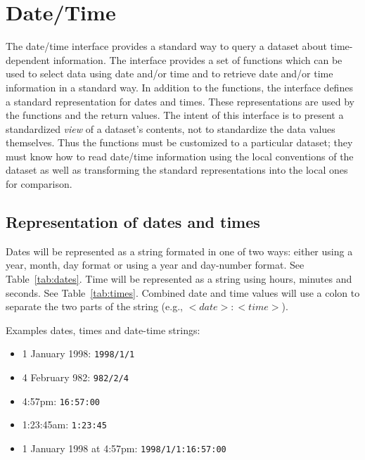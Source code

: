 \documentclass[12pt]{article}
\begin{document}
\begin{description}
\begin{description}
\begin{description}
    \end{description}

  \end{description}

\end{description}

\section{Date/Time}
\label{app:datetime}

The date/time interface provides a standard way to query a dataset about
time-dependent information. The interface provides a set of functions which
can be used to select data using date and/or time and to retrieve date and/or
time information in a standard way. In addition to the functions, the
interface defines a standard representation for dates and times. These
representations are used by the functions and the return values. The intent
of this interface is to present a standardized \emph{view} of a dataset's
contents, not to standardize the data values themselves. Thus the functions
must be customized to a particular dataset; they must know how to read
date/time information using the local conventions of the dataset as well as
transforming the standard representations into the local ones for comparison.

\subsection{Representation of dates and times}

Dates will be represented as a string formated in one of two ways: either
using a year, month, day format or using a year and day-number format. See
Table~\ref{tab:dates}. Time will be represented as a string using hours,
minutes and seconds. See Table~\ref{tab:times}. Combined date and time values will use a
colon to separate the two parts of the string (e.g., $<date>:<time>$).

Examples dates, times and date-time strings:

\begin{itemize}

\item 1 January 1998: {\tt 1998/1/1}
\item 4 February 982: {\tt 982/2/4}
\item 4:57pm: {\tt 16:57:00}
\item 1:23:45am: {\tt 1:23:45}
\item 1 January 1998 at 4:57pm: {\tt 1998/1/1:16:57:00}

\end{itemize}
\end{document}
